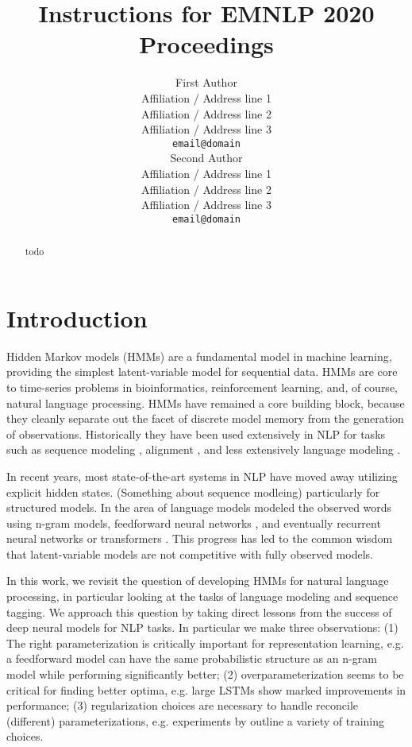 \documentclass[11pt,a4paper]{article}
\title{Instructions for EMNLP 2020 Proceedings}
\author{First Author \\
  Affiliation / Address line 1 \\
  Affiliation / Address line 2 \\
  Affiliation / Address line 3 \\
  \texttt{email@domain} \\\And
  Second Author \\
  Affiliation / Address line 1 \\
  Affiliation / Address line 2 \\
  Affiliation / Address line 3 \\
  \texttt{email@domain} \\}
\date{}
\begin{document}
\maketitle
\begin{abstract}
todo
\end{abstract}

\section{Introduction}


Hidden Markov models (HMMs) are a fundamental model in machine learning,
providing the simplest latent-variable model for sequential data.
HMMs are core to time-series problems in bioinformatics, reinforcement learning, and,
of course, natural language processing.
HMMs have remained a core building block,
because they cleanly separate out the facet of discrete model memory from
the generation of observations.
Historically they have been used extensively in NLP for tasks such as
sequence modeling \citep{rabiner1990tut},
alignment \citep{vogel1996hmm},
and less extensively language modeling \citep{kuhn1994hmmlm,huang2011thesis}. 


In recent years, most state-of-the-art systems in NLP have moved away utilizing explicit hidden states.
(Something about sequence modleing)
particularly for structured models.
In the area of language models modeled the observed words using n-gram models, 
feedforward neural networks \citep{bengio2003nlm},
and eventually recurrent neural networks \citep{mikolov2010rnn,zaremba2014lstm,merity2017awdlstm}
or transformers \citep{radford2019language}.
This progress has led to the common wisdom that latent-variable models are not
competitive with fully observed models.


In this work, we revisit the question of developing HMMs for natural language processing,
in particular looking at the tasks of language modeling and sequence tagging.
We approach this question by taking direct lessons from the success of deep neural models for NLP tasks.
In particular we make three observations:
(1) The right parameterization is critically important for representation learning, e.g. a feedforward model \citet{bengio2003nlm}
can have the same probabilistic structure as an n-gram model while performing significantly better;
(2) overparameterization seems to be critical for finding better optima,
e.g. large LSTMs \citet{zaremba2014lstm} show marked improvements in performance;
(3) regularization choices are necessary to handle reconcile (different) parameterizations,
e.g. experiments by \citet{merity2017awdlstm} outline a variety of training choices.
\end{document}
